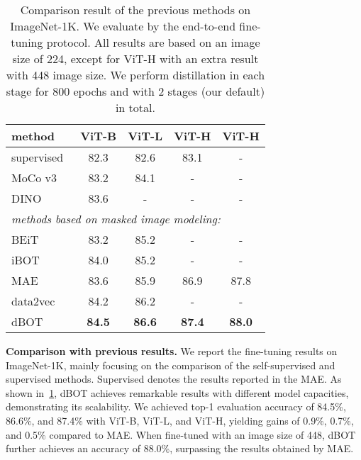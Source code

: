 \documentclass[10pt,twocolumn,letterpaper]{article}
\renewcommand{\paragraph}[1]{\vspace{1.25mm}\noindent\textbf{#1}}
\def\ourmethod{{dBOT}\xspace}
\begin{document}
\begin{table}[t]
    \begin{center}
    \setlength{\tabcolsep}{2mm}
    \begin{tabular}{l|cccc}
        method& ViT-B&ViT-L&ViT-H&ViT-H\\
        \hline
        \textcolor{gray!80}{supervised~\cite{mae}}  & \textcolor{gray!80}{82.3}  &   \textcolor{gray!80}{82.6}    &   \textcolor{gray!80}{83.1}& \textcolor{gray!80}{-}\\
        MoCo v3~\cite{mocov3} &   83.2    &   84.1    &   -   &   -\\
        DINO~\cite{dino} &   83.6    &   -    &   -   &   -\\
        \hline
        \multicolumn{5}{l}{\textit{\small methods based on masked image modeling:}} \\
        \hline
        BEiT~\cite{beit} &   83.2    &   85.2    &   -   &   -\\
        iBOT~\cite{zhou2021ibot}    &   84.0    &   85.2    &   -   &   -\\
        MAE~\cite{mae} &   83.6    &   85.9   &  86.9  & 87.8\\
        data2vec~\cite{baevski2022data2vec}&   84.2    &   86.2    &   -   &   -\\
        \hline
        \ourmethod& \textbf{84.5}&   \textbf{86.6}&   \textbf{87.4} & \textbf{88.0}\\
    \end{tabular}
    \end{center}
    \caption{Comparison result of the previous methods on ImageNet-1K.
    We evaluate by the end-to-end fine-tuning protocol. 
    All results are based on an image size of 224, except for ViT-H with an extra result with 448 image size. 
    We perform distillation in each stage for 800 epochs and with 2 stages (our default) in total.
    }
    \label{tab:sota}
\vspace{-0.2cm}
\end{table}

\paragraph{Comparison with previous results.}
We report the fine-tuning results on ImageNet-1K, mainly focusing on the comparison of the self-supervised and supervised methods. Supervised denotes the results reported in the MAE. 
As shown in~\cref{tab:sota}, \ourmethod achieves remarkable results with different model capacities, demonstrating its scalability.
We achieved top-1 evaluation accuracy of 84.5\%, 86.6\%, and 87.4\% with ViT-B, ViT-L, and ViT-H, yielding gains of 0.9\%, 0.7\%, and 0.5\% compared to MAE. 
When fine-tuned with an image size of 448, \ourmethod further achieves an accuracy of 88.0\%, surpassing the results obtained by MAE. 
\end{document}
